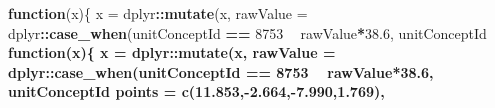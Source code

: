 \documentclass[
]{article}
\newenvironment{Shaded}{\begin{snugshade}}{\end{snugshade}}
\newcommand{\ControlFlowTok}[1]{\textcolor[rgb]{0.13,0.29,0.53}{\textbf{#1}}}
\newcommand{\DataTypeTok}[1]{\textcolor[rgb]{0.13,0.29,0.53}{#1}}
\newcommand{\DecValTok}[1]{\textcolor[rgb]{0.00,0.00,0.81}{#1}}
\newcommand{\FloatTok}[1]{\textcolor[rgb]{0.00,0.00,0.81}{#1}}
\newcommand{\KeywordTok}[1]{\textcolor[rgb]{0.13,0.29,0.53}{\textbf{#1}}}
\newcommand{\NormalTok}[1]{#1}
\newcommand{\OperatorTok}[1]{\textcolor[rgb]{0.81,0.36,0.00}{\textbf{#1}}}
\newcommand{\OtherTok}[1]{\textcolor[rgb]{0.56,0.35,0.01}{#1}}
\newcommand{\StringTok}[1]{\textcolor[rgb]{0.31,0.60,0.02}{#1}}
\begin{document}
\begin{Shaded}
\begin{Highlighting}[]
{{                                                                          \ControlFlowTok{function}\NormalTok{(x)\{ x =}\StringTok{ }\NormalTok{dplyr}\OperatorTok{::}\KeywordTok{mutate}\NormalTok{(x, }\DataTypeTok{rawValue =}\NormalTok{ dplyr}\OperatorTok{::}\KeywordTok{case_when}\NormalTok{(unitConceptId }\OperatorTok{==}\StringTok{ }\DecValTok{8753} \OperatorTok{~}\StringTok{ }\NormalTok{rawValue}\OperatorTok{*}\FloatTok{38.6}\NormalTok{, unitConceptId }\OperatorTok{%in%}\StringTok{ }\KeywordTok{c}\NormalTok{(}\DecValTok{8840}\NormalTok{,}\DecValTok{8954}\NormalTok{,}\DecValTok{9028}\NormalTok{ ) }\OperatorTok{~}\StringTok{ }\NormalTok{rawValue, }\OtherTok{TRUE} \OperatorTok{~}\StringTok{ }\DecValTok{0}\NormalTok{)); x=}\StringTok{ }\NormalTok{dplyr}\OperatorTok{::}\KeywordTok{filter}\NormalTok{(x, rawValue }\OperatorTok{>=}\StringTok{ }\DecValTok{10} \OperatorTok{&}\StringTok{ }\NormalTok{rawValue }\OperatorTok{<=}\StringTok{ }\DecValTok{130}\NormalTok{ ); x =}\StringTok{ }\NormalTok{dplyr}\OperatorTok{::}\KeywordTok{mutate}\NormalTok{(x,}\DataTypeTok{valueAsNumber =} \KeywordTok{log}\NormalTok{(rawValue)); }\KeywordTok{return}\NormalTok{(x)\},}
                                                                          \ControlFlowTok{function}\NormalTok{(x)\{ x =}\StringTok{ }\NormalTok{dplyr}\OperatorTok{::}\KeywordTok{mutate}\NormalTok{(x, }\DataTypeTok{rawValue =}\NormalTok{ dplyr}\OperatorTok{::}\KeywordTok{case_when}\NormalTok{(unitConceptId }\OperatorTok{==}\StringTok{ }\DecValTok{8753} \OperatorTok{~}\StringTok{ }\NormalTok{rawValue}\OperatorTok{*}\FloatTok{38.6}\NormalTok{, unitConceptId }\OperatorTok{%in%}\StringTok{ }\KeywordTok{c}\NormalTok{(}\DecValTok{8840}\NormalTok{,}\DecValTok{8954}\NormalTok{,}\DecValTok{9028}\NormalTok{ ) }\OperatorTok{~}\StringTok{ }\NormalTok{rawValue, }\OtherTok{TRUE} \OperatorTok{~}\StringTok{ }\DecValTok{0}\NormalTok{)); x=}\StringTok{ }\NormalTok{dplyr}\OperatorTok{::}\KeywordTok{filter}\NormalTok{(x, rawValue }\OperatorTok{>=}\StringTok{ }\DecValTok{10} \OperatorTok{&}\StringTok{ }\NormalTok{rawValue }\OperatorTok{<=}\StringTok{ }\DecValTok{130}\NormalTok{ ); x =}\StringTok{ }\NormalTok{dplyr}\OperatorTok{::}\KeywordTok{mutate}\NormalTok{(x,}\DataTypeTok{valueAsNumber =} \KeywordTok{log}\NormalTok{(rawValue)}\OperatorTok{*}\KeywordTok{log}\NormalTok{(age)); }\KeywordTok{return}\NormalTok{(x)\}), }
                                                          \DataTypeTok{points =} \KeywordTok{c}\NormalTok{(}\FloatTok{11.853}\NormalTok{,}\OperatorTok{-}\FloatTok{2.664}\NormalTok{,}\OperatorTok{-}\FloatTok{7.990}\NormalTok{,}\FloatTok{1.769}\NormalTok{),}
}}}}
\end{Highlighting}
\end{Shaded}
\end{document}
